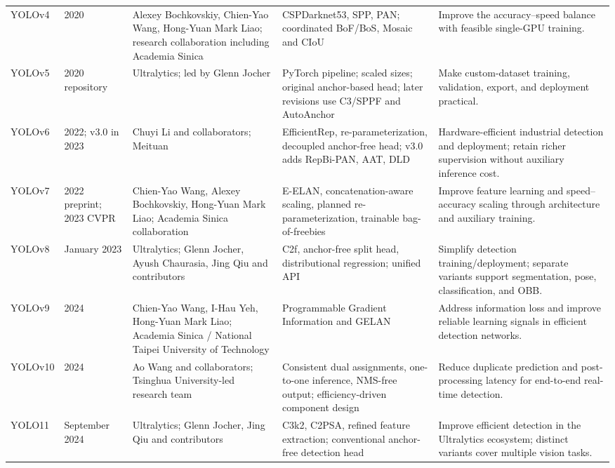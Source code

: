 \documentclass[11pt,a4paper]{article}
\begin{document}
\begin{landscape}
\begin{longtable}{@{}P{1.65cm}P{2.0cm}P{4.25cm}P{6.55cm}P{6.65cm}@{}}
YOLOv4 \cite{bochkovskiy2020yolov4} & 2020 & Alexey Bochkovskiy, Chien-Yao Wang, Hong-Yuan Mark Liao; research collaboration including Academia Sinica & CSPDarknet53, SPP, PAN; coordinated BoF/BoS, Mosaic and CIoU & Improve the accuracy--speed balance with feasible single-GPU training. \\
YOLOv5 \cite{ultralytics2020yolov5,yolov5architecture} & 2020 repository & Ultralytics; led by Glenn Jocher & PyTorch pipeline; scaled sizes; original anchor-based head; later revisions use C3/SPPF and AutoAnchor & Make custom-dataset training, validation, export, and deployment practical. \\
YOLOv6 \cite{li2022yolov6,li2023yolov6} & 2022; v3.0 in 2023 & Chuyi Li and collaborators; Meituan & EfficientRep, re-parameterization, decoupled anchor-free head; v3.0 adds RepBi-PAN, AAT, DLD & Hardware-efficient industrial detection and deployment; retain richer supervision without auxiliary inference cost. \\
YOLOv7 \cite{wang2023yolov7} & 2022 preprint; 2023 CVPR & Chien-Yao Wang, Alexey Bochkovskiy, Hong-Yuan Mark Liao; Academia Sinica collaboration & E-ELAN, concatenation-aware scaling, planned re-parameterization, trainable bag-of-freebies & Improve feature learning and speed--accuracy scaling through architecture and auxiliary training. \\
YOLOv8 \cite{ultralytics2023yolov8,ultralyticscode} & January 2023 & Ultralytics; Glenn Jocher, Ayush Chaurasia, Jing Qiu and contributors & C2f, anchor-free split head, distributional regression; unified API & Simplify detection training/deployment; separate variants support segmentation, pose, classification, and OBB. \\
YOLOv9 \cite{wang2024yolov9} & 2024 & Chien-Yao Wang, I-Hau Yeh, Hong-Yuan Mark Liao; Academia Sinica / National Taipei University of Technology & Programmable Gradient Information and GELAN & Address information loss and improve reliable learning signals in efficient detection networks. \\
YOLOv10 \cite{wang2024yolov10} & 2024 & Ao Wang and collaborators; Tsinghua University-led research team & Consistent dual assignments, one-to-one inference, NMS-free output; efficiency-driven component design & Reduce duplicate prediction and post-processing latency for end-to-end real-time detection. \\
YOLO11 \cite{ultralytics2024yolo11,ultralyticscode} & September 2024 & Ultralytics; Glenn Jocher, Jing Qiu and contributors & C3k2, C2PSA, refined feature extraction; conventional anchor-free detection head & Improve efficient detection in the Ultralytics ecosystem; distinct variants cover multiple vision tasks. \\

\end{longtable}
\end{landscape}
\end{document}

